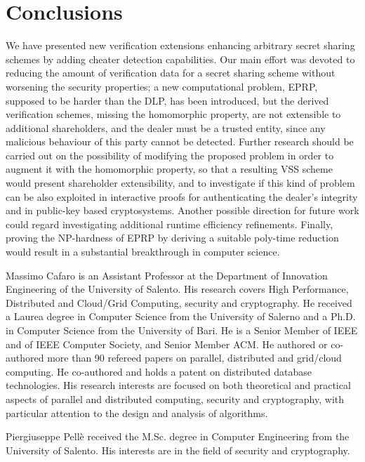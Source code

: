 \documentclass[10pt,journal,cspaper,compsoc]{IEEEtran}
\begin{document}
\section{Conclusions}
\label{conclusions-section}
We have presented new verification extensions enhancing arbitrary secret sharing schemes by adding cheater detection capabilities. Our main effort was devoted to reducing the amount of verification data for a secret sharing scheme without worsening the security properties; a new computational problem, EPRP, supposed to be harder than the DLP, has been introduced, but the derived verification schemes, missing the homomorphic property, are not extensible to additional shareholders, and the dealer must be a trusted entity, since any malicious behaviour of this party cannot be detected.
Further research should be carried out on the possibility of modifying the proposed problem in order to augment it with the homomorphic property, so that a resulting VSS scheme would present shareholder extensibility, and to investigate if this kind of problem can be also exploited in interactive proofs for authenticating the dealer's integrity and in public-key based cryptosystems.  Another possible direction for future work could regard investigating additional runtime efficiency refinements. Finally,  proving the NP-hardness of EPRP by deriving a suitable poly-time reduction would result in a substantial breakthrough in computer science.




































\begin{IEEEbiography}{Massimo Cafaro}
is an Assistant Professor at the Department of Innovation Engineering of the University of Salento. His research covers High Performance, Distributed and Cloud/Grid Computing, security and cryptography. He received a Laurea degree in Computer Science from the University of Salerno and a Ph.D. in Computer Science from the University of Bari. He is a Senior Member of IEEE and of IEEE Computer Society, and Senior Member ACM. He authored or co-authored more than 90 refereed papers on parallel, distributed and grid/cloud computing. He co-authored and holds a patent on distributed database technologies. His research interests are focused on both theoretical and practical aspects of parallel and distributed computing, security and cryptography, with particular attention to the design and analysis of algorithms.
\end{IEEEbiography}

\begin{IEEEbiography}{Piergiuseppe Pell\`e}
received the M.Sc. degree in Computer Engineering from the University of Salento. His interests are in the field of security and cryptography.
\end{IEEEbiography}
\end{document}
